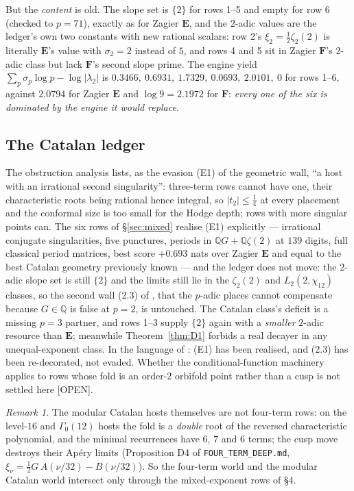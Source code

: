 \documentclass[11pt,reqno]{amsart}
\theoremstyle{plain}
\theoremstyle{definition}
\theoremstyle{remark}
\newtheorem{remark}[theorem]{Remark}
\theoremstyle{plain}
\newcommand{\Q}{\mathbb{Q}}
\newcommand{\Open}{\textup{\textsf{[OPEN]}}}
\begin{document}
But the \emph{content} is old. The slope set is $\{2\}$ for rows 1--5 and empty
for row 6 (checked to $p=71$), exactly as for Zagier $\mathbf E$, and the
$2$-adic values are the ledger's own two constants with new rational scalars: row
2's $\xi_2=\tfrac12\zeta_2(2)$ is literally $\mathbf E$'s value with $\sigma_2=2$
instead of $5$, and rows 4 and 5 sit in Zagier $\mathbf F$'s $2$-adic class but
lack $\mathbf F$'s second slope prime. The engine yield
$\sum_p\sigma_p\log p-\log|\lambda_2|$ is
$0.3466,\ 0.6931,\ 1.7329,\ 0.0693,\ 2.0101,\ 0$
for rows 1--6, against $2.0794$ for Zagier $\mathbf E$ and $\log9=2.1972$ for
$\mathbf F$: \emph{every one of the six is dominated by the engine it would
replace}.

\subsection{The Catalan ledger}
The obstruction analysis \cite{CATOBS} lists, as the evasion (E1) of the
geometric wall, ``a host with an irrational second singularity'': three-term rows
cannot have one, their characteristic roots being rational hence integral, so
$|t_2|\le\tfrac14$ at every placement and the conformal size is too small for the
Hodge depth; rows with more singular points can. The six rows of
\S\ref{sec:mixed} realise (E1) explicitly --- irrational conjugate singularities,
five punctures, periods in $\Q G+\Q\zeta(2)$ at $139$ digits, full classical
period matrices, best score $+0.693$ nats over Zagier $\mathbf E$ and equal to
the best Catalan geometry previously known --- and the ledger does not move: the
$2$-adic slope set is still $\{2\}$ and the limits still lie in the $\zeta_2(2)$
and $L_2(2,\chi_{12})$ classes, so the second wall (2.3) of \cite{CATOBS}, that
the $p$-adic places cannot compensate because $G\in\Q$ is false at $p=2$, is
untouched. The Catalan class's deficit is a missing $p=3$ partner, and rows
1--3 supply $\{2\}$ again with a \emph{smaller} $2$-adic resource than
$\mathbf E$; meanwhile Theorem~\ref{thm:D1} forbids a real decayer in any
unequal-exponent class. In the language of \cite{CATOBS}: (E1) has been
realised, and (2.3) has been re-decorated, not evaded. Whether the
conditional-function machinery applies to rows whose fold is an order-$2$
orbifold point rather than a cusp is not settled here \Open.

\begin{remark}
The modular Catalan hosts themselves are not four-term rows: on the level-$16$ and $\Gamma_0(12)$ hosts the fold is a \emph{double} root of the reversed characteristic polynomial, and the minimal recurrences have $6$, $7$ and $6$ terms; the cusp move destroys their Ap\'ery limits (Proposition D4 of \texttt{FOUR\_TERM\_DEEP.md}, $\xi_\nu=\tfrac12G\,A(\nu/32)-B(\nu/32)$). So the four-term world and the modular Catalan world intersect only through the mixed-exponent rows of \S4.
\end{remark}
\end{document}
